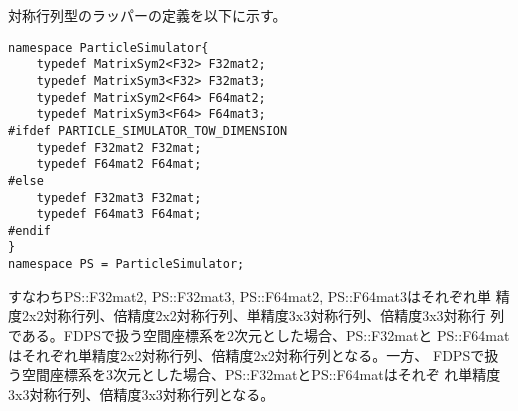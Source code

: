 対称行列型のラッパーの定義を以下に示す。
\begin{lstlisting}[caption=matrixsymwrapper]
namespace ParticleSimulator{
    typedef MatrixSym2<F32> F32mat2;
    typedef MatrixSym3<F32> F32mat3;
    typedef MatrixSym2<F64> F64mat2;
    typedef MatrixSym3<F64> F64mat3;
#ifdef PARTICLE_SIMULATOR_TOW_DIMENSION
    typedef F32mat2 F32mat;
    typedef F64mat2 F64mat;
#else
    typedef F32mat3 F32mat;
    typedef F64mat3 F64mat;
#endif
}
namespace PS = ParticleSimulator;
\end{lstlisting}

すなわちPS::F32mat2, PS::F32mat3, PS::F64mat2, PS::F64mat3はそれぞれ単
精度2x2対称行列、倍精度2x2対称行列、単精度3x3対称行列、倍精度3x3対称行
列である。FDPSで扱う空間座標系を2次元とした場合、PS::F32matと
PS::F64matはそれぞれ単精度2x2対称行列、倍精度2x2対称行列となる。一方、
FDPSで扱う空間座標系を3次元とした場合、PS::F32matとPS::F64matはそれぞ
れ単精度3x3対称行列、倍精度3x3対称行列となる。


